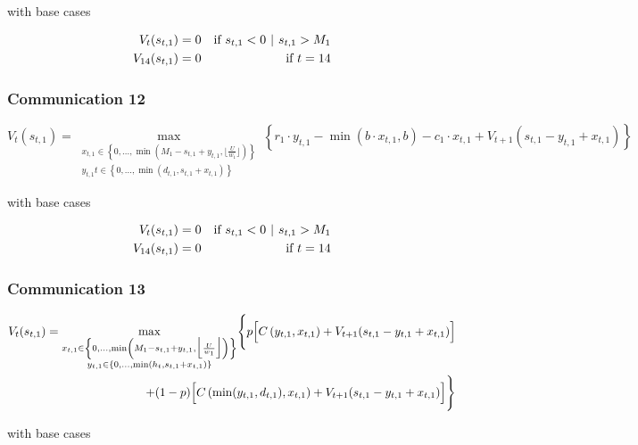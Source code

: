 \documentclass{article}
\begin{document}
with base cases

\begin{align}
    V_t(s_{t,1}) &= 0 & \text{if } s_{t,1} < 0 \hspace{0.125cm} | \hspace{0.125cm} s_{t,1} > M_1 \\
    V_{14}(s_{t,1}) &= 0 & \text{if } t = 14
\end{align}

\subsubsection{Communication 12}

$$V_t(s_{t,1}) = \underset{\substack{ x_{t,1} \in \left\{0,...,\min\left(M_1 - s_{t,1} + y_{t,1},\lfloor\frac{U}{w_1}\rfloor\right)\right\} \\    y_{t,1}t \in \left\{0,...,\min\left(d_{t,1}, s_{t,1} + x_{t,1}\right)\right\} }}{\max} \left\{r_1 \cdot y_{t,1} - \min(b \cdot x_{t,1}, b) - c_1\cdot x_{t,1} + V_{t+1}(s_{t,1}-y_{t,1}+x_{t,1}) \right\} $$

with base cases

\begin{align}
    V_t(s_{t,1}) &= 0 & \text{if } s_{t,1} < 0 \hspace{0.125cm} | \hspace{0.125cm} s_{t,1} > M_1 \\
    V_{14}(s_{t,1}) &= 0 & \text{if } t = 14
\end{align}


\bigskip

\subsubsection{Communication 13}

\begin{align*}
V_t(s_{t,1}) = \underset{\substack{x_{t,1} \in \left\{0,...,\min\left(M_1 - s_{t,1} + y_{t,1},\Big\lfloor \frac{U}{w_1} \Big\rfloor\right)\right\} \\ y_{t,1} \in \left\{0,...,\min\left(h_{t}, s_{t,1} + x_{t,1}\right)\right\} }}{\max} \Biggl\{p \Bigl[C\left(y_{t,1}, x_{t,1}\right) + V_{t+1}(s_{t,1} - y_{t,1}+x_{t,1}) \Bigr] \Biggr. \\
\Biggl.+   (1-p)\Bigl[ C\left(\min(y_{t,1},d_{t,1}), x_{t,1}\right) + V_{t+1}(s_{t,1} - y_{t,1}+x_{t,1})  \Bigr] \Biggr\} 
\end{align*}

with base cases
\end{document}
